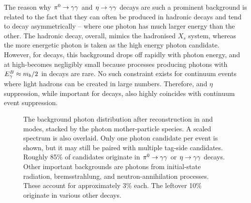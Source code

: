 The reason why $\pi^0\rightarrow\gamma\gamma$ and $\eta\rightarrow\gamma\gamma$ decays are such a prominent background is related to the fact that they can often be produced in hadronic decays and tend to decay asymmetrically -- where one photon has much larger energy than the other.
The hadronic decay, overall, mimics the hadronised $X_s$ system, whereas the more energetic photon is taken as the high energy photon candidate.
However, for \B decays, this background drops off rapidly with photon energy, and at high-\EB becomes negligibly small because processes producing photons with ${E^B_{\gamma}}\approx m_b/2$ in \B decays are rare.
No such constraint exists for continuum events where light hadrons can be created in large numbers.
Therefore, \piz and $\eta$ suppression, while important for \B decays, also highly coincides with continuum event suppression.

\begin{figure}[htbp!]
    \centering
    \caption{\label{fig:photon_sources} The background photon distribution after reconstruction in \feiBp and \feiBz modes, stacked by the photon mother-particle species.
    A scaled \BtoXsgamma spectrum is also overlaid.
    Only one photon candidate per event is shown, but it may still be paired with multiple tag-side candidates.
    Roughly 85\% of candidates originate in $\pi^0\rightarrow\gamma\gamma$ or $\eta\rightarrow\gamma\gamma$ decays.
    Other important backgrounds are photons from initial-state radiation, bremsstrahlung, and neutron-annihilation processes.
    These account for approximately 3\% each.
    The leftover 10\% originate in various other decays.}
\end{figure}

